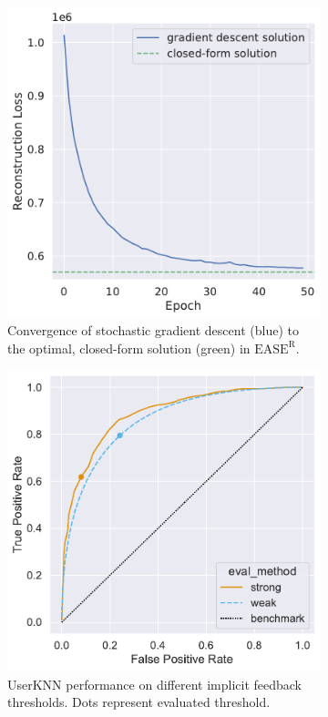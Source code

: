 \documentclass{article}
\newcommand{\easer}{$\text{EASE}^\text{R}$\xspace}
\newcommand{\userknn}{UserKNN\xspace}
\begin{document}
\begin{figure}[h]
	\centering
	\begin{subfigure}[b]{0.4\textwidth}
		\centering
		\includegraphics[width=\textwidth]{figures/recon-loss.pdf}
		\caption{Convergence of stochastic gradient descent (blue) to
			the optimal,
			closed-form solution (green) in \easer.}
		\label{fig:convergence}
	\end{subfigure}
	\hspace{0.1\textwidth}
	\begin{subfigure}[b]{0.4\textwidth}
		\centering
		\includegraphics[width=\textwidth]{figures/user_knn_roc.pdf}
		\caption{\userknn performance on different implicit feedback
			thresholds.
			Dots represent evaluated threshold.
		}
	\end{subfigure}
	\caption{}
	\label{fig:1}
\end{figure}
\end{document}
